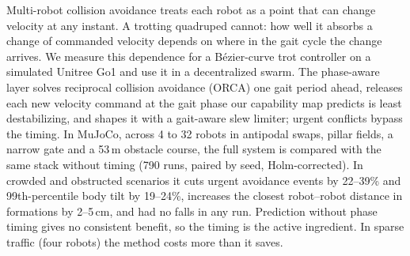 Multi-robot collision avoidance treats each robot as a point that can change velocity at any instant. A
trotting quadruped cannot: how well it absorbs a change of commanded velocity depends on where in the gait
cycle the change arrives. We measure this dependence for a B\'ezier-curve trot controller on a simulated
Unitree Go1 and use it in a decentralized swarm. The phase-aware layer solves reciprocal collision avoidance
(ORCA) one gait period ahead, releases each new velocity command at the gait phase our capability map
predicts is least destabilizing, and shapes it with a gait-aware slew limiter; urgent conflicts bypass the
timing. In MuJoCo, across 4 to 32 robots in antipodal swaps, pillar fields, a narrow gate and a 53\,m obstacle
course, the full system is compared with the same stack without timing (790 runs, paired by seed,
Holm-corrected). In crowded and obstructed scenarios it cuts urgent avoidance events by 22--39\% and
99th-percentile body tilt by 19--24\%, increases the closest robot--robot distance in formations by 2--5\,cm,
and had no falls in any run. Prediction without phase timing gives no consistent benefit, so the timing is the
active ingredient. In sparse traffic (four robots) the method costs more than it saves.
